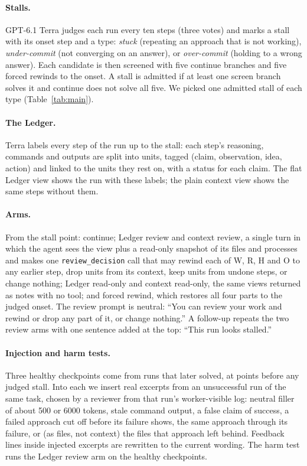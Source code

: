 \documentclass{article}
\newcommand{\arm}[1]{\textsf{#1}}
\begin{document}
\paragraph{Stalls.} GPT-6.1 Terra judges each run every ten steps (three votes) and marks a stall with its onset step
and a type: \emph{stuck} (repeating an approach that is not working), \emph{under-commit} (not converging on an answer),
or \emph{over-commit} (holding to a wrong answer). Each candidate is then screened with five continue branches and five
forced rewinds to the onset. A stall is admitted if at least one screen branch solves it and continue does not solve
all five. We picked one admitted stall of each type (Table~\ref{tab:main}).

\paragraph{The Ledger.} Terra labels every step of the run up to the stall: each step's reasoning, commands and
outputs are split into units, tagged (claim, observation, idea, action) and linked to the units they rest on, with a
status for each claim. The flat Ledger view shows the run with these labels; the plain context view shows the same
steps without them.

\paragraph{Arms.} From the stall point:
\arm{continue};
\arm{Ledger review} and \arm{context review}, a single turn in which the agent sees the view plus a read-only snapshot
of its files and processes and makes one \texttt{review\_decision} call that may rewind each of W, R, H and O to any
earlier step, drop units from its context, keep units from undone steps, or change nothing;
\arm{Ledger read-only} and \arm{context read-only}, the same views returned as notes with no tool;
and \arm{forced rewind}, which restores all four parts to the judged onset.
The review prompt is neutral: ``You can review your work and rewind or drop any part of it, or change nothing.''
A follow-up repeats the two review arms with one sentence added at the top: ``This run looks stalled.''

\paragraph{Injection and harm tests.} Three healthy checkpoints come from runs that later solved, at points before
any judged stall. Into each we insert real excerpts from an unsuccessful run of the same task, chosen by a reviewer
from that run's worker-visible log: neutral filler of about 500 or 6000 tokens, stale command output, a false claim of
success, a failed approach cut off before its failure shows, the same approach through its failure, or (as files, not
context) the files that approach left behind. Feedback lines inside injected excerpts are rewritten to the current
wording. The harm test runs the Ledger review arm on the healthy checkpoints.
\end{document}
